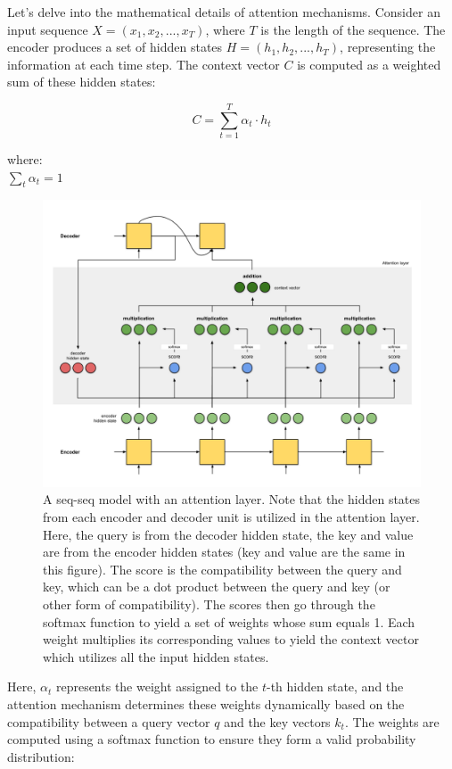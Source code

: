 \documentclass{report}
\begin{document}
Let's delve into the mathematical details of attention mechanisms. Consider an input sequence \(X = (x_1, x_2, ..., x_T)\), where \(T\) is the length of the sequence. The encoder produces a set of hidden states \(H = (h_1, h_2, ..., h_T)\), representing the information at each time step. The context vector \(C\) is computed as a weighted sum of these hidden states:

\[ C = \sum_{t=1}^{T} \alpha_t \cdot h_t \]

where:\\
$\sum_t\alpha_t = 1$

\begin{figure}[ht]
	\includegraphics[width=350pt]{59}
	\centering
	\caption{A seq-seq model with an attention layer. Note that the hidden states from each encoder and decoder unit is utilized in the attention layer. Here, the query is from the decoder hidden state, the key and value are from the encoder hidden states (key and value are the same in this figure). The score is the compatibility between the query and key, which can be a dot product between the query and key (or other form of compatibility). The scores then go through the softmax function to yield a set of weights whose sum equals 1. Each weight multiplies its corresponding values to yield the context vector which utilizes all the input hidden states.}
\end{figure}

Here, \(\alpha_t\) represents the weight assigned to the \(t\)-th hidden state, and the attention mechanism determines these weights dynamically based on the compatibility between a query vector \(q\) and the key vectors \(k_t\). The weights are computed using a softmax function to ensure they form a valid probability distribution:
\end{document}
